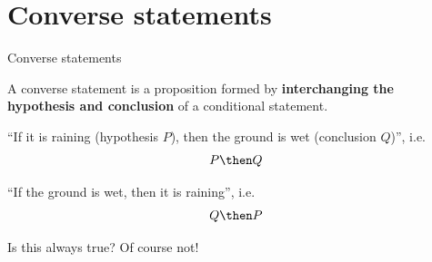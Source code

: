 \documentclass[12pt,aspectratio=1610, handout]{beamer}
\begin{document}
\section{Converse statements}
\begin{frame}{Converse statements}
	\begin{definition}[Converse]
		A converse statement is a proposition formed by \textbf{interchanging the hypothesis and conclusion} of a conditional statement.
	\end{definition}
	\p
	
		\begin{example}
			``If it is raining (hypothesis $P$), then the ground is wet (conclusion $Q$)'', i.e. $$P \then Q$$
		\end{example}\p
		
		\begin{example}[Converse]
			``If the ground is wet, then it is raining'', i.e. $$Q \then P$$ 
		\end{example}\p
		Is this always true? \p Of course not!
\end{frame}
\end{document}
